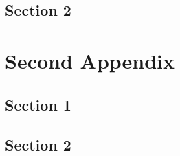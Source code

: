   \section{Section 2}\label{sec:A1section2}
    \lipsum[38]

\chapter{Second Appendix}\label{app:secondAppendix}
  \section{Section 1}\label{sec:A2section1}
    \lipsum[34-36]
  \section{Section 2}\label{sec:A2section2}
    \lipsum[38]





